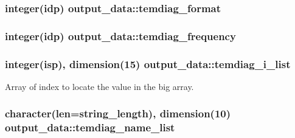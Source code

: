 \subsubsection[{\texorpdfstring{temdiag\+\_\+format}{temdiag_format}}]{\setlength{\rightskip}{0pt plus 5cm}integer(idp) output\+\_\+data\+::temdiag\+\_\+format}\hypertarget{namespaceoutput__data_a2f4ce5fdd4011f5db5c6b9de97cf133a}{}\label{namespaceoutput__data_a2f4ce5fdd4011f5db5c6b9de97cf133a}
\subsubsection[{\texorpdfstring{temdiag\+\_\+frequency}{temdiag_frequency}}]{\setlength{\rightskip}{0pt plus 5cm}integer(idp) output\+\_\+data\+::temdiag\+\_\+frequency}\hypertarget{namespaceoutput__data_ab55f479db67f7b4af32d0a55e2ba6620}{}\label{namespaceoutput__data_ab55f479db67f7b4af32d0a55e2ba6620}
\subsubsection[{\texorpdfstring{temdiag\+\_\+i\+\_\+list}{temdiag_i_list}}]{\setlength{\rightskip}{0pt plus 5cm}integer(isp), dimension(15) output\+\_\+data\+::temdiag\+\_\+i\+\_\+list}\hypertarget{namespaceoutput__data_a9cf412af092dd4e6d2877134a66b665d}{}\label{namespaceoutput__data_a9cf412af092dd4e6d2877134a66b665d}


Array of index to locate the value in the big array. 

\subsubsection[{\texorpdfstring{temdiag\+\_\+name\+\_\+list}{temdiag_name_list}}]{\setlength{\rightskip}{0pt plus 5cm}character(len=string\+\_\+length), dimension(10) output\+\_\+data\+::temdiag\+\_\+name\+\_\+list}\hypertarget{namespaceoutput__data_a891f4f8be197dbbfe91c01ee5260b4c2}{}\label{namespaceoutput__data_a891f4f8be197dbbfe91c01ee5260b4c2}


